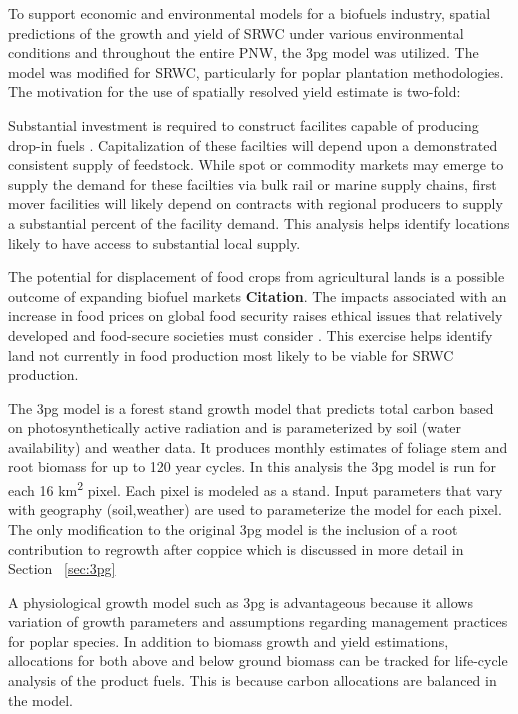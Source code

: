 \documentclass[preprint,12pt]{elsarticle}
\begin{document}
To support economic and environmental models for a biofuels industry,
spatial predictions of the growth and yield of \acf{SRWC} under
various environmental conditions and throughout the entire \acf{PNW},
the \acf{3pg} model was utilized.  The 
model was modified for
\ac{SRWC}, particularly for poplar plantation methodologies. The
motivation for the use of spatially resolved yield estimate is two-fold:
\begin{description}
\item[Biofuels production system optimization] Substantial investment
  is required to construct facilites capable of producing drop-in
  fuels \cite{Parker2010a}. Capitalization of these facilties will
  depend upon a demonstrated
  consistent supply of feedstock. While spot or commodity markets may
  emerge to supply the demand for these facilties via bulk rail or
  marine supply chains, first mover facilities will
  likely depend on contracts with regional producers to supply a
  substantial percent of the facility demand. This analysis helps
  identify locations likely to have access to substantial local
  supply.
\item[Land use] The potential for displacement of food crops from
  agricultural lands is a possible outcome of expanding biofuel
  markets \textbf{Citation}. The impacts associated with an increase in food
  prices on global food security raises ethical issues that relatively
  developed and food-secure societies must consider
  \cite{Pimentel2008}. This exercise helps identify land not currently
  in food production most likely to be viable for \ac{SRWC} production.
\item
\end{description}

The \ac{3pg} model \cite{Landsberg1997} is a forest stand growth model that predicts total carbon
based on photosynthetically active radiation and is parameterized by
soil (water availability) and weather data. It produces monthly
estimates of foliage stem and root biomass for up to 120 year
cycles. In this analysis the \ac{3pg} model is run for each 16
km\textsuperscript{2} pixel. Each pixel is modeled as a stand. Input
parameters that vary with geography (soil,weather) are used to
parameterize the model for each pixel. The only modification to the
original \ac{3pg} model is the inclusion of a root contribution to
regrowth after coppice which is discussed in more detail in Section ~\ref{sec:3pg}

A physiological growth model such as \ac{3pg} is advantageous because
it allows variation of growth parameters and assumptions regarding
management practices for poplar species.  In addition to biomass
growth and yield estimations, allocations for both above and below
ground biomass can be tracked for life-cycle analysis of the product
fuels.  This is because carbon allocations are balanced in the model.
\end{document}
